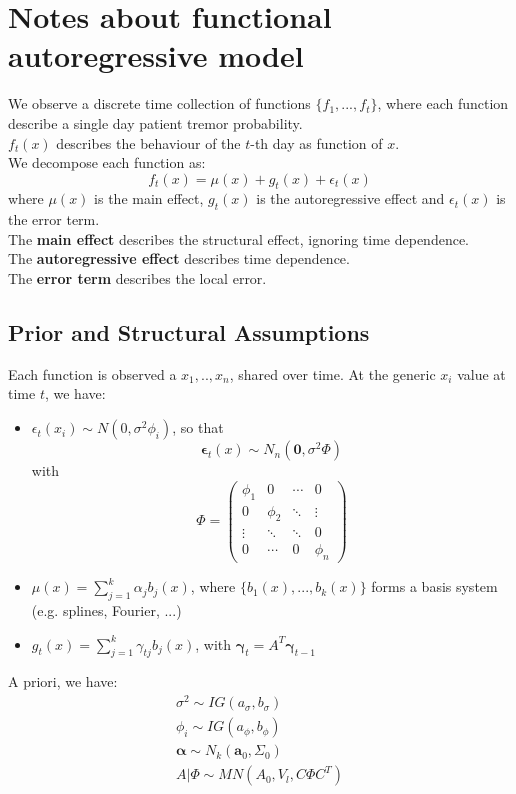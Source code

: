 \section{Notes about functional autoregressive model}
We observe a discrete time collection of functions $\{f_1, ..., f_t\}$, where each function describe a single day patient tremor probability. \\
$f_t(x)$ describes the behaviour of the $t$-th day as function of $x$.\\

We decompose each function as: 
\begin{equation}
    f_t(x) = \mu(x) + g_t(x) + \epsilon_t(x)
\label{generazione}
\end{equation}
where $\mu(x)$ is the main effect, $g_t(x)$ is the autoregressive effect and $\epsilon_t(x)$ is the error term. \\
The \textbf{main effect} describes the structural effect, ignoring time dependence.\\
The \textbf{autoregressive effect} describes time dependence. \\
The \textbf{error term} describes the local error. 

\subsection{Prior and Structural Assumptions}
Each function is observed a $x_1, .., x_n$, shared over time. At the generic $x_i$ value at time $t$, we have: 
\begin{itemize}
    \item $\epsilon_t(x_i) \sim N(0, \sigma^2 \phi_i)$, so that 
    \begin{equation}
        \boldsymbol{\epsilon}_t(x) \sim N_n(\textbf{0}, \sigma^2 \Phi) 
    \end{equation}
    with
    \[
        \Phi =
        \begin{pmatrix}
        \phi_1 & 0              & \cdots & 0 \\
        0              & \phi_2 & \ddots & \vdots \\
        \vdots         & \ddots          & \ddots & 0 \\
        0              & \cdots          & 0      &  \phi_n
        \end{pmatrix}
        \]
        
    \item $\mu(x) = \sum_{j=1}^k \alpha_j b_j(x)$, where $\{b_1(x), ..., b_k(x)\}$ forms a basis system (e.g. splines, Fourier, ...)
    \item $g_t(x) = \sum_{j=1}^k \gamma_{tj} b_j(x)$, with $\boldsymbol{\gamma}_t = A^T \boldsymbol{\gamma}_{t-1}$
\end{itemize}
A priori, we have: 
\begin{gather}
    \sigma^2 \sim IG(a_\sigma, b_\sigma) \\
    \phi_i \sim IG(a_\phi, b_\phi) \\
    \boldsymbol{\alpha} \sim N_k(\textbf{a}_0, \Sigma_0) \\
    A | \Phi \sim MN(A_0, V_l, C \Phi C^T)
\end{gather}

